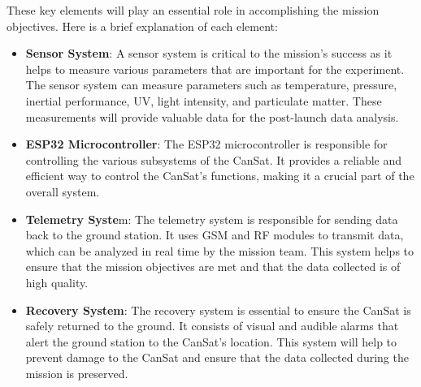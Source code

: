 \documentclass[11pt]{article}
\begin{document}
These key elements will play an essential role in accomplishing the mission objectives. Here is a brief explanation of each element:
\begin{itemize}[leftmargin=1.27cm, itemindent=0cm, topsep=2pt, label=\faTasks]
    \item[\faThermometerQuarter] \textbf{Sensor System}: A sensor system is critical to the mission's success as it helps to measure various parameters that are important for the experiment. The sensor system can measure parameters such as temperature, pressure, inertial performance, UV, light intensity, and particulate matter. These measurements will provide valuable data for the post-launch data analysis.
    \item[\faMicrochip] \textbf{ESP32 Microcontroller}: The ESP32 microcontroller is responsible for controlling the various subsystems of the CanSat. It provides a reliable and efficient way to control the CanSat's functions, making it a crucial part of the overall system.
    \item[\faBroadcastTower] \textbf{Telemetry Syste}m: The telemetry system is responsible for sending data back to the ground station. It uses GSM and RF modules to transmit data, which can be analyzed in real time by the mission team. This system helps to ensure that the mission objectives are met and that the data collected is of high quality.
    \item[ \faParachuteBox] \textbf{Recovery System}: The recovery system is essential to ensure the CanSat is safely returned to the ground. It consists of visual and audible alarms that alert the ground station to the CanSat's location. This system will help to prevent damage to the CanSat and ensure that the data collected during the mission is preserved.

\end{itemize}
\end{document}
